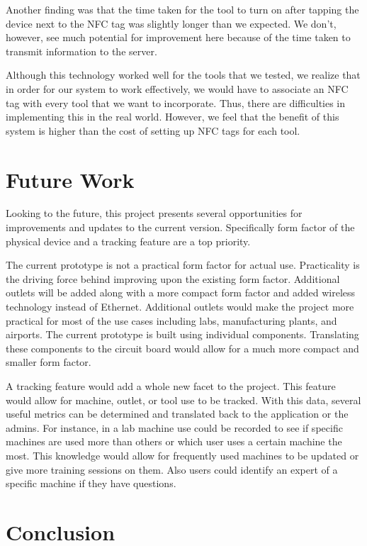 \documentclass{sigchi}
\begin{document}
Another finding was that the time taken for the tool to turn on after tapping the device next to the NFC tag was slightly longer than we expected. We don't, however, see much potential for improvement here because of the time taken to transmit information to the server.

Although this technology worked well for the tools that we tested, we realize that in order for our system to work effectively, we would have to associate an NFC tag with every tool that we want to incorporate. Thus, there are difficulties in implementing this in the real world. However, we feel that the benefit of this system is higher than the cost of setting up NFC tags for each tool.

\section{Future Work}
Looking to the future, this project presents several opportunities for improvements and updates to the current version. Specifically form factor of the physical device and a tracking feature are a top priority. 

The current prototype is not a practical form factor for actual use. Practicality is the driving force behind improving upon the existing form factor. Additional outlets will be added along with a more compact form factor and added wireless technology instead of Ethernet. Additional outlets would make the project more practical for most of the use cases including labs, manufacturing plants, and airports. The current prototype is built using individual components. Translating these components to the circuit board would allow for a much more compact and smaller form factor. 

A tracking feature would add a whole new facet to the project. This feature would allow for machine, outlet, or tool use to be tracked. With this data, several useful metrics can be determined and translated back to the application or the admins. For instance, in a lab machine use could be recorded to see if specific machines are used more than others or which user uses a certain machine the most. This knowledge would allow for frequently used machines to be updated or give more training sessions on them. Also users could identify an expert of a specific machine if they have questions.
\section{Conclusion}
\end{document}
